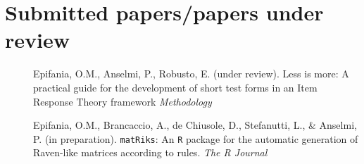 \documentclass[letterpaper,12pt]{article}
\begin{document}
\section{Submitted papers/papers under review}
\begin{description}
	
	\item[] Epifania, O.M., Anselmi, P., Robusto, E. (under review). 	Less is more: A practical guide for the development of short test forms in an Item Response Theory framework \emph{Methodology} 
	
	
	\item[] Epifania, O.M., Brancaccio, A., de Chiusole, D., Stefanutti, L., \& Anselmi, P. (in preparation). \texttt{matRiks}: An \texttt{R} package for the automatic generation of Raven-like matrices according to rules. \emph{The R Journal}
	
\end{description}
	
\end{document}

